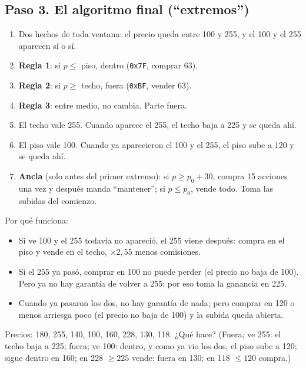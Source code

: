 \documentclass[11pt,letterpaper]{article}
\begin{document}
\subsection*{Paso 3. El algoritmo final (``extremos'')}
\begin{enumerate}
\item Dos hechos de toda ventana: el precio queda entre 100 y 255, y el 100 y el 255 aparecen sí o sí.
\item \textbf{Regla 1}: si $p \le$ piso, dentro (\texttt{0x7F}, comprar 63).
\item \textbf{Regla 2}: si $p \ge$ techo, fuera (\texttt{0xBF}, vender 63).
\item \textbf{Regla 3}: entre medio, no cambia. Parte fuera.
\item El techo vale 255. Cuando aparece el 255, el techo baja a 225 y se queda ahí.
\item El piso vale 100. Cuando ya aparecieron el 100 y el 255, el piso sube a 120 y se queda ahí.
\item \textbf{Ancla} (solo antes del primer extremo): si $p \ge p_0 + 30$, compra 15 acciones una vez y
  después manda ``mantener''; si $p \le p_0$, vende todo. Toma las subidas del comienzo.
\end{enumerate}
Por qué funciona:
\begin{itemize}
\item Si ve 100 y el 255 todavía no apareció, el 255 viene después: compra en el piso y vende en el
  techo, $\times 2{,}55$ menos comisiones.
\item Si el 255 ya pasó, comprar en 100 no puede perder (el precio no baja de 100). Pero ya no hay
  garantía de volver a 255: por eso toma la ganancia en 225.
\item Cuando ya pasaron los dos, no hay garantía de nada; pero comprar en 120 o menos arriesga poco
  (el precio no baja de 100) y la subida queda abierta.
\end{itemize}
\begin{checkpoint}
Precios: 180, 255, 140, 100, 160, 228, 130, 118. ¿Qué hace? (Fuera; ve 255: el techo baja a 225; fuera;
ve 100: dentro, y como ya vio los dos, el piso sube a 120; sigue dentro en 160; en 228 $\ge 225$ vende;
fuera en 130; en 118 $\le 120$ compra.)
\end{checkpoint}
\end{document}
